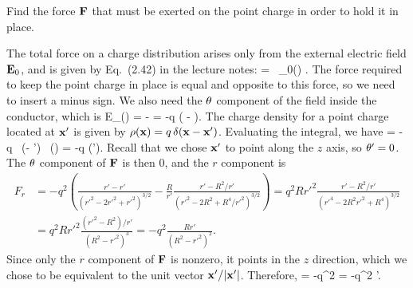 \newcommand{\vEo}{\vE_0}
\newcommand{\del}{\delta}
\newcommand{\Etht}{E_\tht}
\newcommand{\Fr}{F_r}

\begin{problem}
	Find the force $\mathbf{F}$ that must be exerted on the point charge in order to hold it in place.
\end{problem}

\begin{solution}
	The total force on a charge distribution arises only from the external electric field $\vEo$, and is given by Eq.~(2.42) in the lecture notes:
	\beq
		\vF = \int \rhox \, \vEo(\vx) \dcx.
	\eeq
	The force required to keep the point charge in place is equal and opposite to this force, so we need to insert a minus sign.  We also need the $\theta$ component of the field inside the conductor, which is
	\beq
		\Etht(\vx) = - \pdv{\Gdxxp}{\tht}
		= -q \left(  -  \right).
	\eeq
	The charge density for a point charge located at $\mathbf{x}'$ is given by $\rho(\mathbf{x}) = q \, \delta(\mathbf{x} - \mathbf{x}')$.  Evaluating the integral, we have
	\beq
		\vF = -\int q \, \delta(\vx - \vx') \, \vE(\vx) \dcx
		= -q \vE(\vx').
	\eeq
	Recall that we chose $\mathbf{x}'$ to point along the $z$ axis, so $\theta' = 0$.  The $\theta$ component of $\mathbf{F}$ is then $0$, and the $r$ component is
	\begin{align*}
		\Fr &= -q^2 \left( \frac{r' - r'}{({r'}^2 - 2 {r'}^2 + {r'}^2)^{3/2}} - \frac{R}{r'} \frac{r' - R^2 / r'}{({r'}^2 - 2 R^2 + R^4 / {r'}^2)^{3/2}} \right)
		= q^2 R {r'}^2 \frac{r' - R^2 / r'}{({r'}^4 - 2 R^2 {r'}^2 + R^4)^{3/2}} \\
		&= q^2 R {r'}^2 \frac{({r'}^2 - R^2) / r'}{(R^2 - {r'}^2)^3}
		= -q^2 \frac{R r'}{(R^2 - {r'}^2)^2}.
	\end{align*}
	Since only the $r$ component of $\mathbf{F}$ is nonzero, it points in the $z$ direction, which we chose to be equivalent to the unit vector $\mathbf{x}' / \abs{\mathbf{x}'}$.  Therefore,
	\beq
		\vF = -q^2  
		= -q^2  \vx'.
	\eeq
\end{solution}
